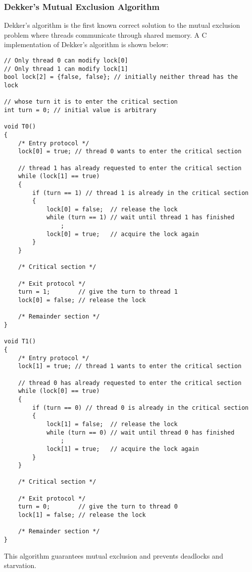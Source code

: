 \documentclass{article}
\begin{document}
\subsubsection{Dekker's Mutual Exclusion Algorithm}
Dekker's algorithm is the first known correct solution to the mutual
exclusion problem where threads communicate through shared memory. A C
implementation of Dekker's algorithm is shown below:
\begin{verbatim}
// Only thread 0 can modify lock[0]
// Only thread 1 can modify lock[1]
bool lock[2] = {false, false}; // initially neither thread has the lock

// whose turn it is to enter the critical section
int turn = 0; // initial value is arbitrary

void T0()
{
    /* Entry protocol */
    lock[0] = true; // thread 0 wants to enter the critical section

    // thread 1 has already requested to enter the critical section
    while (lock[1] == true)
    {
        if (turn == 1) // thread 1 is already in the critical section
        {
            lock[0] = false;  // release the lock
            while (turn == 1) // wait until thread 1 has finished
                ;
            lock[0] = true;   // acquire the lock again
        }
    }

    /* Critical section */

    /* Exit protocol */
    turn = 1;        // give the turn to thread 1
    lock[0] = false; // release the lock

    /* Remainder section */
}

void T1()
{
    /* Entry protocol */
    lock[1] = true; // thread 1 wants to enter the critical section

    // thread 0 has already requested to enter the critical section
    while (lock[0] == true)
    {
        if (turn == 0) // thread 0 is already in the critical section
        {
            lock[1] = false;  // release the lock
            while (turn == 0) // wait until thread 0 has finished
                ;
            lock[1] = true;   // acquire the lock again
        }
    }

    /* Critical section */

    /* Exit protocol */
    turn = 0;        // give the turn to thread 0
    lock[1] = false; // release the lock

    /* Remainder section */
}
\end{verbatim}
This algorithm guarantees mutual exclusion and prevents deadlocks and
starvation.
\end{document}
